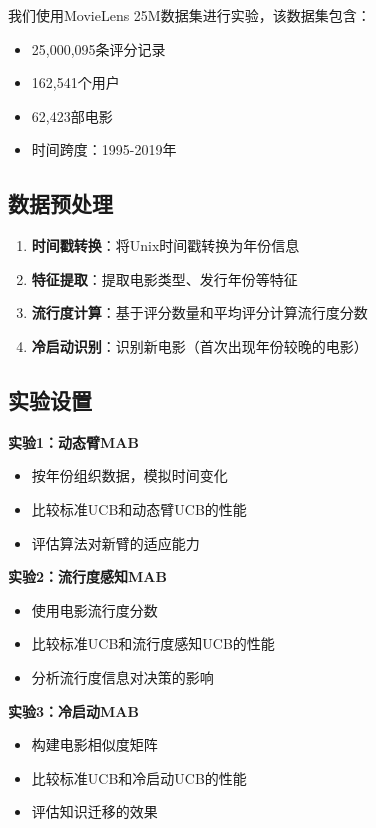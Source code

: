 \documentclass[12pt,a4paper]{article}
\begin{document}
我们使用MovieLens 25M数据集进行实验，该数据集包含：
\begin{itemize}
    \item 25,000,095条评分记录
    \item 162,541个用户
    \item 62,423部电影
    \item 时间跨度：1995-2019年
\end{itemize}

\subsection{数据预处理}

\begin{enumerate}
    \item \textbf{时间戳转换}：将Unix时间戳转换为年份信息
    \item \textbf{特征提取}：提取电影类型、发行年份等特征
    \item \textbf{流行度计算}：基于评分数量和平均评分计算流行度分数
    \item \textbf{冷启动识别}：识别新电影（首次出现年份较晚的电影）
\end{enumerate}

\subsection{实验设置}

\textbf{实验1：动态臂MAB}
\begin{itemize}
    \item 按年份组织数据，模拟时间变化
    \item 比较标准UCB和动态臂UCB的性能
    \item 评估算法对新臂的适应能力
\end{itemize}

\textbf{实验2：流行度感知MAB}
\begin{itemize}
    \item 使用电影流行度分数
    \item 比较标准UCB和流行度感知UCB的性能
    \item 分析流行度信息对决策的影响
\end{itemize}

\textbf{实验3：冷启动MAB}
\begin{itemize}
    \item 构建电影相似度矩阵
    \item 比较标准UCB和冷启动UCB的性能
    \item 评估知识迁移的效果
\end{itemize}
\end{document}
